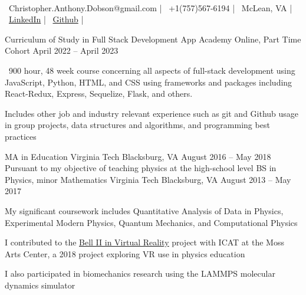 \documentclass[]{awesome-cv}
\begin{document}
    
\begin{center}
	  \\
	\vspace{2mm}
	{\faEnvelope\ Christopher.Anthony.Dobson@gmail.com} | {\faMobile\ +1(757)567-6194} | {\faMapMarker\ McLean, VA} |
	{\faLink\ \href{https://www.linkedin.com/in/christopher-dobson-64850a232/}{LinkedIn}} | {\faGithub\ \href{https://github.com/cadobson}{Github}} | 
\end{center}
\begin{cventries}
	\cventry
	{Curriculum of Study in Full Stack Development}
	{App Academy}
	{Online, Part Time Cohort}
	{April 2022 – April 2023}
	{\begin{cvitems}
			\item {~900 hour, 48 week course concerning all aspects of full-stack development using JavaScript, Python, HTML, and CSS using frameworks and packages including React-Redux, Express, Sequelize, Flask, and others.}
			\item {Includes other job and industry relevant experience such as git and Github usage in group projects, data structures and algorithms, and programming best practices}
		\end{cvitems}}
	\cventry
	{MA in Education}
	{Virginia Tech}
	{Blacksburg, VA}
	{August 2016 – May 2018}
	{Pursuant to my objective of teaching physics at the high-school level}
	\cventry
	{BS in Physics, minor Mathematics}
	{Virginia Tech}
	{Blacksburg, VA}
	{August 2013 – May 2017}
	{\begin{cvitems}
			\item {My significant coursework includes Quantitative Analysis of Data in Physics, Experimental Modern Physics, Quantum Mechanics, and Computational Physics}
			\item {I contributed to the \underline{ \href{https://store.steampowered.com/app/810020/Belle_II_in_Virtual_Reality/}{Bell II in Virtual Reality}} project with ICAT at the Moss Arts Center, a 2018 project exploring VR use in physics education}
			\item {I also participated in biomechanics research using the LAMMPS molecular dynamics simulator}
	\end{cvitems}}
\end{cventries}
\vspace{-2mm}
\end{document}
